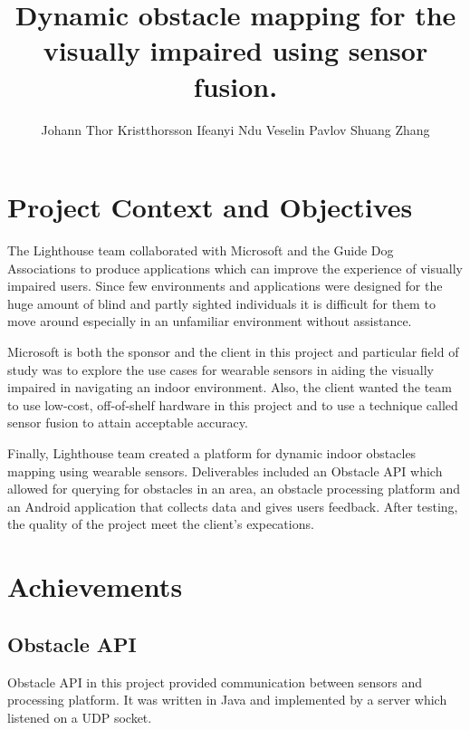 \documentclass[prodmode,acmtosem]{acmsmall} %
\begin{document}

\title{Dynamic obstacle mapping for the visually impaired using sensor fusion.}
\author{Johann Thor Kristthorsson
Ifeanyi Ndu
Veselin Pavlov
Shuang Zhang
}

\maketitle

\section{Project Context and Objectives}
The Lighthouse team collaborated with Microsoft and the Guide Dog Associations to produce applications which can improve the experience of visually impaired users. Since few environments and applications were designed for the huge amount of blind and partly sighted individuals it is difficult for them to move around especially in an unfamiliar environment without assistance. 

Microsoft is both the sponsor and the client in this project and particular field of study was to explore the use cases for wearable sensors in aiding the visually impaired in navigating an indoor environment. Also, the client wanted the team to use low-cost, off-of-shelf hardware in this project and to use a technique called sensor fusion to attain acceptable accuracy.

Finally, Lighthouse team created a platform for dynamic indoor obstacles mapping using wearable sensors. Deliverables included an Obstacle API which allowed for querying for obstacles in an area, an obstacle processing platform and an Android application that collects data and gives users feedback. After testing, the quality of the project meet the client's expecations.

\section{Achievements}
\subsection{Obstacle API}
Obstacle API in this project provided communication between sensors and processing platform. It was written in Java and implemented by a server which listened on a UDP socket.
\end{document}
